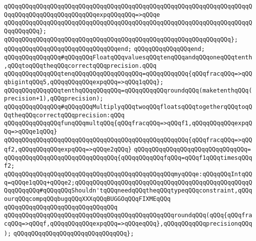 \verb|qQQqqQQqqQQqqQQqqQQqqQQqqQQqqQQqqQQqqQQqqQQqqQQqqQQqqQQqqQQqqQQqqQQqqQQqqQQqqQQqqQQqqQQqqQQqqQQqexpqQQqqQQq=>qQQqe|\newline
\verb|qQQqqQQqqQQqqQQqqQQqqQQqqQQqqQQqqQQqqQQqqQQqqQQqqQQqqQQqqQQqqQQqqQQqqQQqqQQqqQQq};|\newline
\verb|qQQqqQQqqQQqqQQqqQQqqQQqqQQqqQQqqQQqqQQqqQQqqQQqqQQqqQQqqQQqqQQq};|\newline
\verb|qQQqqQQqqQQqqQQqqQQqqQQqqQQqqQQqend;|\newline
\verb|qQQqqQQqqQQqqQQqend;|\newline
\newline
\verb|qQQqqQQqqQQqqQQq#qQQqqQQqFloatqQQqvaluesqQQqtenqQQqandqQQqoneqQQqtenth,qQQqtoqQQqtheqQQqcorrectqQQqprecision.qQQq|\newline
\verb|qQQqqQQqqQQqqQQqtenqQQqqQQqqQQqqQQqqQQq=qQQqqQQqqQQq{qQQqfracqQQq=>qQQqbigintqQQq5,qQQqqQQqqQQqexpqQQq=>qQQq1qQQq};|\newline
\verb|qQQqqQQqqQQqqQQqtenthqQQqqQQqqQQq=qQQqqQQqqQQqroundqQQq(maketenthqQQq(precision+1),qQQqprecision);|\newline
\newline
\verb|qQQqqQQqqQQqqQQq#qQQqqQQqMultiplyqQQqtwoqQQqfloatsqQQqtogetherqQQqtoqQQqtheqQQqcorrectqQQqprecision:qQQq|\newline
\newline
\verb|qQQqqQQqqQQqqQQqfunqQQqmultqQQq{qQQqfracqQQq=>qQQqf1,qQQqqQQqqQQqexpqQQq=>qQQqe1qQQq}|\newline
\verb|qQQqqQQqqQQqqQQqqQQqqQQqqQQqqQQqqQQqqQQqqQQqqQQqqQQq{qQQqfracqQQq=>qQQqf2,qQQqqQQqqQQqexpqQQq=>qQQqe2qQQq}|\newline
\verb|qQQqqQQqqQQqqQQqqQQqqQQqqQQqqQQq=|\newline
\verb|qQQqqQQqqQQqqQQqqQQqqQQqqQQqqQQq{qQQqqQQqqQQqfqQQq=qQQqf1qQQqtimesqQQqf2;|\newline
\newline
\verb|qQQqqQQqqQQqqQQqqQQqqQQqqQQqqQQqqQQqqQQqqQQqqQQqmyqQQqe:qQQqqQQqIntqQQq=qQQqe1qQQq+qQQqe2;qQQqqQQqqQQqqQQqqQQqqQQqqQQqqQQqqQQqqQQqqQQqqQQqqQQqqQQqqQQq#qQQqqQQqShouldn'tqQQqneedqQQqtheqQQqtypeqQQqconstraint,qQQqourqQQqcompqQQqbugqQQqXXXqQQqBUGGOqQQqFIXMEqQQq|\newline
\verb|qQQqqQQqqQQqqQQqqQQqqQQqqQQqqQQq|\newline
\verb|qQQqqQQqqQQqqQQqqQQqqQQqqQQqqQQqqQQqqQQqqQQqqQQqroundqQQq(qQQq{qQQqfracqQQq=>qQQqf,qQQqqQQqqQQqexpqQQq=>qQQqeqQQq},qQQqqQQqqQQqprecisionqQQq);|\newline
\verb|qQQqqQQqqQQqqQQqqQQqqQQqqQQqqQQq};|\newline
